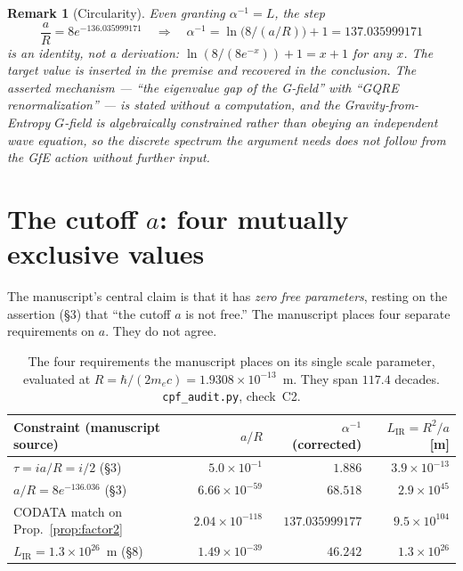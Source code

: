 \documentclass[11pt,a4paper]{article}
\newtheorem{remark}{Remark}
\begin{document}
\begin{remark}[Circularity]
Even granting $\alpha^{-1}=L$, the step
\[
\frac{a}{R} = 8e^{-136.035999171}
\quad\Longrightarrow\quad
\alpha^{-1} = \ln\!\bigl(8/(a/R)\bigr)+1 = 137.035999171
\]
is an identity, not a derivation: $\ln(8/(8e^{-x}))+1 = x+1$ for any $x$. The
target value is inserted in the premise and recovered in the conclusion. The
asserted mechanism --- ``the eigenvalue gap of the G-field'' with ``GQRE
renormalization'' --- is stated without a computation, and the Gravity-from-Entropy
$G$-field is \emph{algebraically constrained} rather than obeying an independent
wave equation, so the discrete spectrum the argument needs does not follow from the
GfE action without further input.
\end{remark}

\section{The cutoff $a$: four mutually exclusive values}
\label{sec:cutoff}

The manuscript's central claim is that it has \emph{zero free parameters}, resting on
the assertion (\S3) that ``the cutoff $a$ is not free.'' The manuscript places four
separate requirements on $a$. They do not agree.

\begin{table}[h]
\centering
\small
\begin{tabular}{p{}rrr}
\toprule
Constraint (manuscript source) & $a/R$ & $\alpha^{-1}$ (corrected) &
  $L_{\mathrm{IR}}=R^2/a$ [m] \\
\midrule
$\tau = ia/R = i/2$ \hfill (\S3) & $5.0\times10^{-1}$ & $1.886$ & $3.9\times10^{-13}$ \\
$a/R = 8e^{-136.036}$ \hfill (\S3) & $6.66\times10^{-59}$ & $68.518$ & $2.9\times10^{45}$ \\
CODATA match on Prop.~\ref{prop:factor2} & $2.04\times10^{-118}$ & $137.035999177$ & $9.5\times10^{104}$ \\
$L_{\mathrm{IR}}=1.3\times10^{26}$~m \hfill (\S8) & $1.49\times10^{-39}$ & $46.242$ & $1.3\times10^{26}$ \\
\bottomrule
\end{tabular}
\caption{The four requirements the manuscript places on its single scale
parameter, evaluated at $R=\hbar/(2m_ec)=1.9308\times10^{-13}$~m. They span
$117.4$ decades. \texttt{cpf\_audit.py}, check~C2.}
\end{table}
\end{document}
